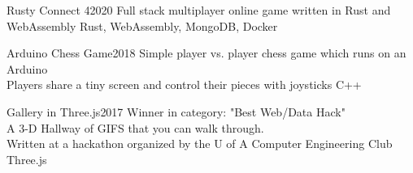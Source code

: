 
\begin{projects}
    \project
    {Rusty Connect 4}{2020}
    {}
    {Full stack multiplayer online game written in Rust and WebAssembly}
    {Rust, WebAssembly, MongoDB, Docker}

    \project
    {Arduino Chess Game}{2018}
    {}
    {Simple player vs. player chess game which runs on an Arduino\\
      Players share a tiny screen and control their pieces with joysticks}
    {C++}

	\project
	{Gallery in Three.js}{2017}
	{}
	{
            Winner in category: "Best Web/Data Hack"\\
            A 3-D Hallway of GIFS that you can walk through.\\
            Written at a hackathon organized by the U of A Computer Engineering Club 
    }
    {Three.js}
				

\end{projects}
